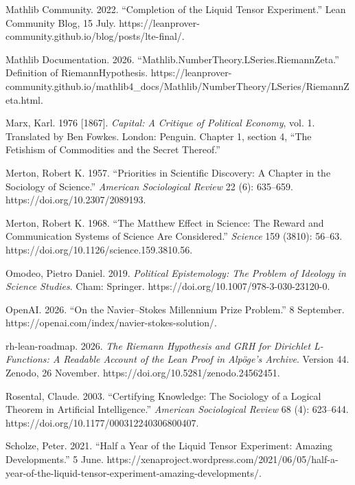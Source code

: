 \documentclass[sn-apa]{sn-jnl}
\begin{document}
\noindent\hangindent=0.5in Mathlib Community. 2022. “Completion of the Liquid Tensor Experiment.” Lean Community Blog, 15 July. https://leanprover-community.github.io/blog/posts/lte-final/.\par\medskip
\noindent\hangindent=0.5in Mathlib Documentation. 2026. “Mathlib.NumberTheory.LSeries.RiemannZeta.” Definition of RiemannHypothesis. https://leanprover-community.github.io/mathlib4\_docs/Mathlib/NumberTheory/LSeries/RiemannZeta.html.\par\medskip
\noindent\hangindent=0.5in Marx, Karl. 1976 [1867]. \emph{Capital: A Critique of Political Economy}, vol. 1. Translated by Ben Fowkes. London: Penguin. Chapter 1, section 4, “The Fetishism of Commodities and the Secret Thereof.”\par\medskip
\noindent\hangindent=0.5in Merton, Robert K. 1957. “Priorities in Scientific Discovery: A Chapter in the Sociology of Science.” \emph{American Sociological Review} 22 (6): 635–659. https://doi.org/10.2307/2089193.\par\medskip
\noindent\hangindent=0.5in Merton, Robert K. 1968. “The Matthew Effect in Science: The Reward and Communication Systems of Science Are Considered.” \emph{Science} 159 (3810): 56–63. https://doi.org/10.1126/science.159.3810.56.\par\medskip
\noindent\hangindent=0.5in Omodeo, Pietro Daniel. 2019. \emph{Political Epistemology: The Problem of Ideology in Science Studies}. Cham: Springer. https://doi.org/10.1007/978-3-030-23120-0.\par\medskip
\noindent\hangindent=0.5in OpenAI. 2026. “On the Navier–Stokes Millennium Prize Problem.” 8 September. https://openai.com/index/navier-stokes-solution/.\par\medskip
\noindent\hangindent=0.5in rh-lean-roadmap. 2026. \emph{The Riemann Hypothesis and GRH for Dirichlet L-Functions: A Readable Account of the Lean Proof in Alpöge’s Archive}. Version 44. Zenodo, 26 November. https://doi.org/10.5281/zenodo.24562451.\par\medskip
\noindent\hangindent=0.5in Rosental, Claude. 2003. “Certifying Knowledge: The Sociology of a Logical Theorem in Artificial Intelligence.” \emph{American Sociological Review} 68 (4): 623–644. https://doi.org/10.1177/000312240306800407.\par\medskip
\noindent\hangindent=0.5in Scholze, Peter. 2021. “Half a Year of the Liquid Tensor Experiment: Amazing Developments.” 5 June. https://xenaproject.wordpress.com/2021/06/05/half-a-year-of-the-liquid-tensor-experiment-amazing-developments/.\par\medskip
\end{document}
